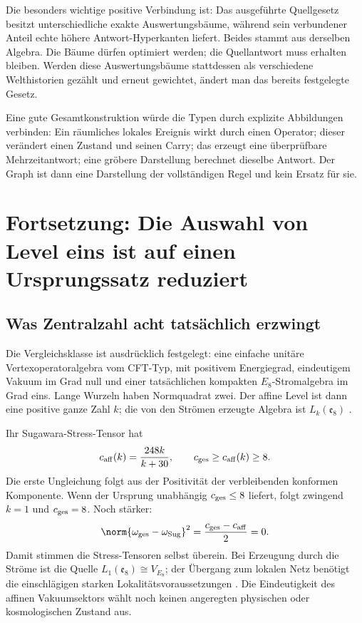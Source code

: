 Die besonders wichtige positive Verbindung ist: Das ausgeführte Quellgesetz besitzt unterschiedliche exakte Auswertungsbäume, während sein verbundener Anteil echte höhere Antwort-Hyperkanten liefert. Beides stammt aus derselben Algebra. Die Bäume dürfen optimiert werden; die Quellantwort muss erhalten bleiben. Werden diese Auswertungsbäume stattdessen als verschiedene Welthistorien gezählt und erneut gewichtet, ändert man das bereits festgelegte Gesetz.

Eine gute Gesamtkonstruktion würde die Typen durch explizite Abbildungen verbinden: Ein räumliches lokales Ereignis wirkt durch einen Operator; dieser verändert einen Zustand und seinen Carry; das erzeugt eine überprüfbare Mehrzeitantwort; eine gröbere Darstellung berechnet dieselbe Antwort. Der Graph ist dann eine Darstellung der vollständigen Regel und kein Ersatz für sie.

\section{Fortsetzung: Die Auswahl von Level eins ist auf einen Ursprungssatz reduziert}\label{sec:levelselection}


\subsection{Was Zentralzahl acht tatsächlich erzwingt}
Die Vergleichsklasse ist ausdrücklich festgelegt: eine einfache unitäre Vertexoperatoralgebra vom CFT-Typ, mit positivem Energiegrad, eindeutigem Vakuum im Grad null und einer tatsächlichen kompakten $E_8$-Stromalgebra im Grad eins. Lange Wurzeln haben Normquadrat zwei. Der affine Level ist dann eine positive ganze Zahl $k$; die von den Strömen erzeugte Algebra ist $L_k(\mathfrak e_8)$ \cite{donglin}.

Ihr Sugawara-Stress-Tensor hat
\begin{equation}
c_{\rm aff}(k)=\frac{248k}{k+30},\qquad
c_{\rm ges}\ge c_{\rm aff}(k)\ge8.
\end{equation}
Die erste Ungleichung folgt aus der Positivität der verbleibenden konformen Komponente. Wenn der Ursprung unabhängig $c_{\rm ges}\le8$ liefert, folgt zwingend $k=1$ und $c_{\rm ges}=8$. Noch stärker:
\begin{equation}
\norm{\omega_{\rm ges}-\omega_{\rm Sug}}^2
=\frac{c_{\rm ges}-c_{\rm aff}}2=0.
\end{equation}
Damit stimmen die Stress-Tensoren selbst überein. Bei Erzeugung durch die Ströme ist die Quelle $L_1(\mathfrak e_8)\cong V_{E_8}$; der Übergang zum lokalen Netz benötigt die einschlägigen starken Lokalitätsvoraussetzungen \cite{cklw}. Die Eindeutigkeit des affinen Vakuumsektors wählt noch keinen angeregten physischen oder kosmologischen Zustand aus.

